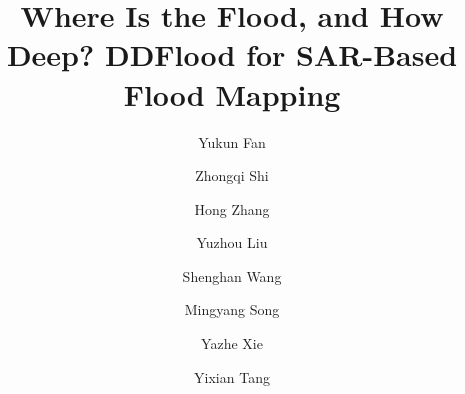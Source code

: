 \documentclass[authoryear,preprint,12pt]{elsarticle}
\begin{document}
\doublespacing
\setlength{\emergencystretch}{1em}
\pagestyle{plain}

\begingroup
{}
\begin{frontmatter}

\title{Where Is the Flood, and How Deep? DDFlood for SAR-Based Flood Mapping}

\author[a,b,c]{Yukun Fan}
\author[d,e]{Zhongqi Shi}
\author[b,a,c]{Hong Zhang\texorpdfstring{}{}}
\author[d,e]{Yuzhou Liu}
\author[a,b,c]{Shenghan Wang}
\author[a,b,c]{Mingyang Song}
\author[a,b,c]{Yazhe Xie}
\author[a,b,c]{Yixian Tang}

\address[a]{Key Laboratory of Digital Earth Science, Aerospace Information Research Institute, Chinese Academy of Sciences, Beijing, 100094, China}
\address[b]{International Research Center of Big Data for Sustainable Development Goals, Beijing, 100094, China}
\address[c]{University of Chinese Academy of Sciences, Beijing, 100049, China}
\address[d]{Shenzhen Technology Institute of Urban Public Safety, Shenzhen, 518000, China}
\address[e]{Urban Safety Development Institute of Science and Technology (Shenzhen), Shenzhen, Guangdong, 518023, China}

\begin{abstract}


\end{abstract}
\end{frontmatter}
\end{document}
